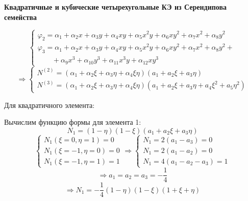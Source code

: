\documentclass{bmstu}
\begin{document}
\begin{center}
	\textbf{Квадратичные и кубические четырехугольные КЭ из Серендипова семейства}
\end{center}
\[
\begin{cases}
\varphi_2=\alpha_1+\alpha_2x+\alpha_3y+\alpha_4xy+\alpha_5x^2y+\alpha_6xy^2+\alpha_7x^2+\alpha_8y^2 \\
\varphi_3= \alpha_1+\alpha_2x+\alpha_3y+\alpha_4xy+\alpha_5x^2y+\alpha_6xy^2+\alpha_7x^2+\alpha_8y^2 + \\
\qquad +\alpha_9x^3+\alpha_{10}y^3+\alpha_{11}x^3y+\alpha_{12}xy^3
\end{cases}
\]
\[
\Rightarrow
\begin{cases}
	N^{(2)}=(\alpha_1+\alpha_2\xi+\alpha_3\eta+\alpha_4\xi\eta)(a_1+a_2\xi+a_3\eta) \\
	N^{(3)}=(\alpha_1+\alpha_2\xi+\alpha_3\eta+\alpha_4\xi\eta)(a_1+a_2\xi+a_3\eta+a_4\xi^2+a_5\eta^2)
\end{cases}
\]

Для квадратичного элемента:

\begin{center}
\end{center}

Вычислим функцию формы для элемента 1:
\[
	N_1=(1-\eta)(1-\xi)(a_1+a_2\xi+a_3\eta) 
\]
\[ \begin{cases}
	N_1(\xi=0, \eta=1)=0 \\
	N_1(\xi=-1, \eta=0) =0 \\
	N_1(\xi=-1, \eta=1) = 1 \end{cases} \Rightarrow \begin{cases} N_1=2(a_1-a_3)=0 \\ N_1=2(a_1-a_2)=0 \\ N_1 = 4(a_1-a_2-a_3)=1  \end{cases}
\]
\[
\Rightarrow a_1=a_2=a_3=-\frac{1}{4} 
\]
\[
	\Rightarrow N_1=-\frac{1}{4}(1-\eta)(1-\xi)(1+\xi+\eta) 
\]
\end{document}
